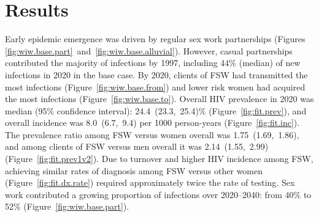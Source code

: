 \section{Results}\label{res}
Early epidemic emergence was driven by regular sex work partnerships
(Figures \ref{fig:wiw.base.part}~and~\ref{fig:wiw.base.alluvial}).
However, casual partnerships contributed the majority of infections by 1997, %
including 44\% (median) of new infections in 2020 in the base case. %
By 2020, clients of FSW had transmitted the most infections (Figure~\ref{fig:wiw.base.from})
and lower risk women had acquired the most infections (Figure~\ref{fig:wiw.base.to}).
Overall HIV prevalence in 2020 was median (95\% confidence interval):
24.4~(23.3,~25.4)\% (Figure~\ref{fig:fit.prev}), %
and overall incidence was 8.0~(6.7,~9.4) per 1000 person-years (Figure~\ref{fig:fit.inc}).
The prevalence ratio among FSW versus women overall was 1.75~(1.69,~1.86), %
and among clients of FSW versus men overall it was 2.14~(1.55,~2.99) %
(Figure~\ref{fig:fit.prev1v2}).
Due to turnover and higher HIV incidence among FSW,
achieving similar rates of diagnosis among FSW versus other women (Figure~\ref{fig:fit.dx.rate})
required approximately twice the rate of testing. %
Sex work contributed a growing proportion of infections
over 2020--2040: from 40\% to 52\% (Figure~\ref{fig:wiw.base.part}). %
